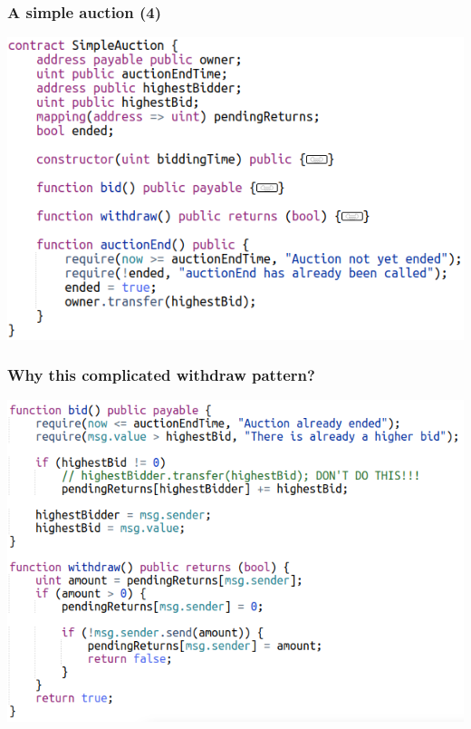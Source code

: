\documentclass[11pt]{beamer}  %
\begin{document}
\begin{frame}\frametitle{A simple auction (4)}

  \begin{center}
    \includegraphics[scale=0.52,clip=false]{pictures/simple-auction-4.png}
  \end{center}

\end{frame}

\begin{frame}\frametitle{Why this complicated withdraw pattern?}

  \begin{center}
    \includegraphics[scale=0.5,clip=false]{pictures/simple-auction-withdraw.png}
  \end{center}

\end{frame}
\end{document}
